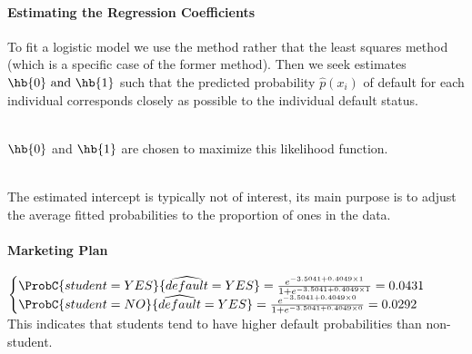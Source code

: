 \paragraph{Estimating the Regression Coefficients}
To fit a logistic model we use the  method 
rather that the least squares method (which is a specific case of the
former method). Then we seek estimates $\hb{0}\text{ and }\hb{1}$
such that the predicted probability $\widehat{p}\left(x_{i}\right)$ of
default for each individual corresponds closely as possible to the 
individual default status.
\begin{center}
\\
$\hb{0}$ and $\hb{1}$ are chosen to maximize this likelihood function.
\end{center}
\\The estimated intercept is typically not of interest, its main 
purpose is to adjust the average fitted probabilities to the proportion
of ones in the data.
\paragraph{Marketing Plan}
$\begin{cases}
	\ProbC{{student=YES}}{\widehat{default}=YES}=\frac{e^{-3.5041+0.4049\times 1}}{1+e^{-3.5041+0.4049\times 1}}=0.0431\\
	\ProbC{{student=NO}}{\widehat{default}=YES}=\frac{e^{-3.5041+0.4049\times 0}}{1+e^{-3.5041+0.4049\times 0}}=0.0292
\end{cases}$\\
This indicates that students tend to have higher default probabilities
than non-student.

